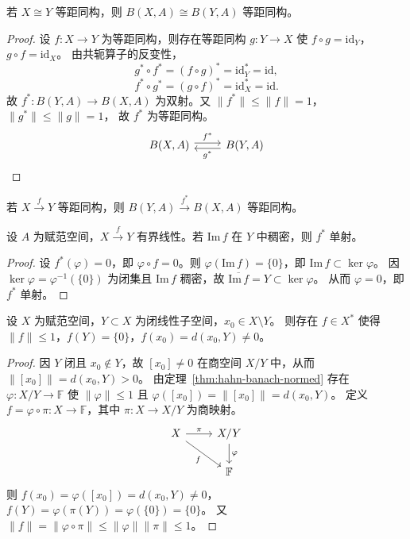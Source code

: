 \documentclass[lang=cn,a4paper,newtx,section]{elegantbook}
\begin{document}
\begin{theorem}
  若 $X\cong Y$ 等距同构，则 $B(X,A)\cong B(Y,A)$ 等距同构。
\end{theorem}

\begin{proof}
  设 $f:X\to Y$ 为等距同构，则存在等距同构 $g:Y\to X$ 使 $f\circ g=\mathrm{id}_Y$，$g\circ f=\mathrm{id}_X$。
  由共轭算子的反变性，
  \[
    g^*\circ f^*=(f\circ g)^*=\mathrm{id}_Y^*=\mathrm{id},
  \]
  \[
    f^*\circ g^*=(g\circ f)^*=\mathrm{id}_X^*=\mathrm{id}.
  \]
  故 $f^*:B(Y,A)\to B(X,A)$ 为双射。又 $\|f^*\|\le\|f\|=1$，$\|g^*\|\le\|g\|=1$，
  故 $f^*$ 为等距同构。
  \[
    \begin{tikzcd}
      B(X,A) \arrow[r,"f^*",shift left] & B(Y,A) \arrow[l,"g^*",shift left]
    \end{tikzcd}
  \]
\end{proof}

\begin{remark}
  若 $X\xrightarrow{f}Y$ 等距同构，则 $B(Y,A)\xrightarrow{f^*}B(X,A)$ 等距同构。
\end{remark}

\begin{proposition}
  设 $A$ 为赋范空间，$X\xrightarrow{f}Y$ 有界线性。若 $\mathrm{Im}\,f$ 在 $Y$ 中稠密，则 $f^*$ 单射。
\end{proposition}

\begin{proof}
  设 $f^*(\varphi)=0$，即 $\varphi\circ f=0$。则 $\varphi(\mathrm{Im}\,f)=\{0\}$，即 $\mathrm{Im}\,f\subset\ker\varphi$。
  因 $\ker\varphi=\varphi^{-1}(\{0\})$ 为闭集且 $\mathrm{Im}\,f$ 稠密，故 $\overline{\mathrm{Im}\,f}=Y\subset\ker\varphi$。
  从而 $\varphi=0$，即 $f^*$ 单射。
\end{proof}

\begin{lemma}\label{lem:separate-point-subspace}
  设 $X$ 为赋范空间，$Y\subset X$ 为闭线性子空间，$x_0\in X\setminus Y$。
  则存在 $f\in X^*$ 使得 $\|f\|\le 1$，$f(Y)=\{0\}$，$f(x_0)=d(x_0,Y)\ne 0$。
\end{lemma}

\begin{proof}
  因 $Y$ 闭且 $x_0\notin Y$，故 $[x_0]\ne 0$ 在商空间 $X/Y$ 中，从而 $\|[x_0]\|=d(x_0,Y)>0$。
  由定理~\ref{thm:hahn-banach-normed} 存在 $\varphi:X/Y\to\mathbb{F}$ 使 $\|\varphi\|\le 1$ 且 $\varphi([x_0])=\|[x_0]\|=d(x_0,Y)$。
  定义 $f=\varphi\circ\pi:X\to\mathbb{F}$，其中 $\pi:X\to X/Y$ 为商映射。
  \[
    \begin{tikzcd}
      X \arrow[r,"\pi"] \arrow[dr,"f"'] & X/Y \arrow[d,"\varphi"] \\
      & \mathbb{F}
    \end{tikzcd}
  \]
  则 $f(x_0)=\varphi([x_0])=d(x_0,Y)\ne 0$，$f(Y)=\varphi(\pi(Y))=\varphi(\{0\})=\{0\}$。
  又 $\|f\|=\|\varphi\circ\pi\|\le\|\varphi\|\|\pi\|\le 1$。
\end{proof}
\end{document}
